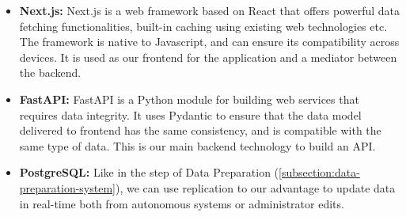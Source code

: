 \begin{itemize}[leftmargin=80pt]
    \item \textbf{Next.js:} Next.js is a web framework based on React that offers powerful data fetching functionalities, built-in caching using existing web technologies etc. \\
    The framework is native to Javascript, and can ensure its compatibility across devices. It is used as our frontend for the application and a mediator between the backend.
    \item \textbf{FastAPI:} FastAPI is a Python module for building web services that requires data integrity. It uses Pydantic to ensure that the data model
    delivered to frontend has the same consistency, and is compatible with the same type of data. This is our main backend technology to build an API.
    \item \textbf{PostgreSQL:} Like in the step of Data Preparation (\ref{subsection:data-preparation-system}), we can use replication to our advantage to update data in real-time
    both from autonomous systems or administrator edits.
\end{itemize}